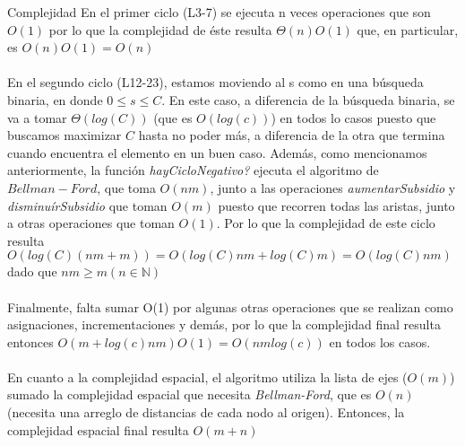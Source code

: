 \begin{subsection}{Complejidad}
En el primer ciclo (L3-7) se ejecuta n veces operaciones que son $O(1)$ por lo que la complejidad de \'{e}ste resulta $\Theta(n)O(1)$ que, en particular, es $O(n)O(1)=O(n)$\\ \\
En el segundo ciclo (L12-23), estamos moviendo al s como en una b\'{u}squeda binaria, en donde $0 \leq s \leq C$. En este caso, a diferencia de la b\'{u}squeda binaria, se va a tomar $\Theta(log(C))$ (que es $O(log(c))$) en todos lo casos puesto que buscamos maximizar $C$ hasta no poder m\'{a}s, a diferencia de la otra que termina cuando encuentra el elemento en un buen caso. 
Adem\'{a}s, como mencionamos anteriormente, la funci\'{o}n \textit{hayCicloNegativo?} ejecuta el algoritmo de $Bellman-Ford$, que toma $O(nm)$, junto a las operaciones \textit{aumentarSubsidio} y \textit{disminu\'{i}rSubsidio} que toman $O(m)$ puesto que recorren todas las aristas, junto a otras operaciones que toman $O(1)$. Por lo que la complejidad de este ciclo resulta $O(log(C)(nm+m))=O(log(C)nm+log(C)m)=O(log(C)nm)$ dado que $nm \geq m (n\in \mathbb{N})$ \\ \\
Finalmente, falta sumar O(1) por algunas otras operaciones que se realizan como asignaciones, incrementaciones y dem\'{a}s, por lo que la complejidad final resulta entonces  $O(m+log(c)nm)O(1)=O(nmlog(c))$ en todos los casos. \\ \\
En cuanto a la complejidad espacial, el algoritmo utiliza la lista de ejes ($O(m)$) sumado la complejidad espacial que necesita \textit{Bellman-Ford}, que es $O(n)$ (necesita una arreglo de distancias de cada nodo al origen). Entonces, la complejidad espacial final resulta $O(m+n)$
\end{subsection}

